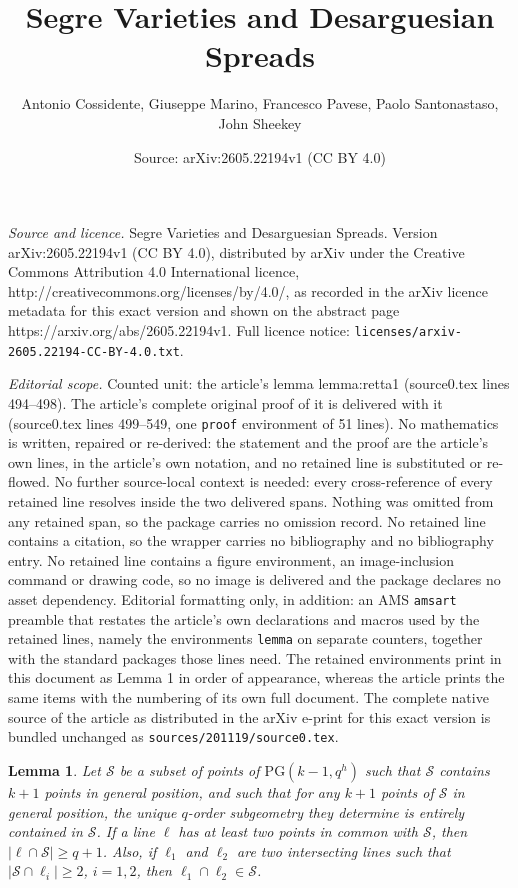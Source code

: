 \documentclass[10pt,a4paper]{amsart}
\title{Segre Varieties and Desarguesian Spreads}
\author{Antonio Cossidente, Giuseppe Marino, Francesco Pavese, Paolo Santonastaso, John Sheekey}
\date{Source: arXiv:2605.22194v1 (CC BY 4.0)}
\newtheorem{lemma}{Lemma}
\def\PG{\mathrm{PG}}
\def\cS{\mathcal S}
\begin{document}
\maketitle

\noindent\emph{Source and licence.} Segre Varieties and Desarguesian Spreads. Version arXiv:2605.22194v1 (CC BY 4.0), distributed by arXiv under the Creative Commons Attribution 4.0 International licence, http://creativecommons.org/licenses/by/4.0/, as recorded in the arXiv licence metadata for this exact version and shown on the abstract page https://arxiv.org/abs/2605.22194v1. Full licence notice: \texttt{licenses/arxiv-2605.22194-CC-BY-4.0.txt}.\par\smallskip

\noindent\textit{Editorial scope.} Counted unit: the article's lemma lemma:retta1 (source0.tex lines 494--498). The article's complete original proof of it is delivered with it (source0.tex lines 499--549, one \texttt{proof} environment of 51 lines). No mathematics is written, repaired or re-derived: the statement and the proof are the article's own lines, in the article's own notation, and no retained line is substituted or re-flowed.  No further source-local context is needed: every cross-reference of every retained line resolves inside the two delivered spans.  Nothing was omitted from any retained span, so the package carries no omission record.  No retained line contains a citation, so the wrapper carries no bibliography and no bibliography entry.  No retained line contains a figure environment, an image-inclusion command or drawing code, so no image is delivered and the package declares no asset dependency.  Editorial formatting only, in addition: an AMS \texttt{amsart} preamble that restates the article's own declarations and macros used by the retained lines, namely the environments \texttt{lemma} on separate counters, together with the standard packages those lines need.  The retained environments print in this document as Lemma 1 in order of appearance, whereas the article prints the same items with the numbering of its own full document.  The complete native source of the article as distributed in the arXiv e-print for this exact version is bundled unchanged as \texttt{sources/201119/source0.tex}.
\begin{lemma} \label{lemma:retta1}
Let $\cS$ be a subset of points of $\PG(k-1,q^h)$ such that $\cS$ contains $k+1$ points in general position, and such that for any 
$k+1$ points of $\cS$ in general position, the unique $q$-order 
subgeometry they determine is entirely contained in $\cS$. If a line $\ell$ has at least two points in common with $\cS$, then $|\ell \cap \cS| \ge q+1$. Also, if $\ell_1$ and $\ell_2$ are two intersecting lines such that $|\cS \cap \ell_i| \ge 2$, $i = 1,2$, then $\ell_1 \cap \ell_2 \in \cS$. 
\end{lemma}
\end{document}
